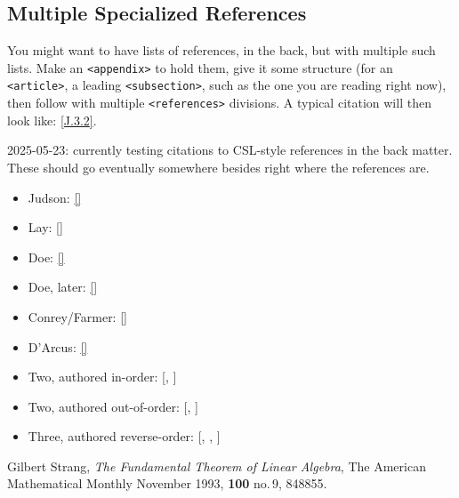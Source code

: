 \documentclass[pdflatex]{sn-jnl}
\theoremstyle{thmstyleone}%
\theoremstyle{thmstyletwo}%
\theoremstyle{thmstylethree}%
\newcommand{\xreffont}{\relax}
\newcommand{\mono}[1]{\texttt{#1}}
\numberwithin{equation}{section}
\begin{document}
\begin{appendices}
\subsection{Multiple Specialized References}\label{appendix-multiple-references-2}%
You might want to have lists of references, in the back, but with multiple such lists.  Make an \mono{<appendix>} to hold them, give it some structure (for an \mono{<article>}, a leading \mono{<subsection>}, such as the one you are reading right now), then follow with multiple \mono{<references>} divisions.  A typical citation will then look like: \hyperlink{biblio-strang-article-tres}{[{\xreffont J.3.2}]}.%
\par
2025-05-23: currently testing citations to CSL-style references in the back matter.  These should go eventually somewhere besides right where the references are.%
\begin{itemize}[label=\textbullet]
\item{}Judson: \hyperlink{biblio-judson-aata}{[{\xreffont 1}]}%
\item{}Lay: \hyperlink{biblio-lay-article}{[{\xreffont 2}]}%
\item{}Doe: \hyperlink{citeproc-py-item-3}{[{\xreffont 4}]}%
\item{}Doe, later: \hyperlink{citeproc-py-item-3-later}{[{\xreffont 3}]}%
\item{}Conrey\slash{}Farmer: \hyperlink{conrey-farmer}{[{\xreffont 5}]}%
\item{}D'Arcus: \hyperlink{citeproc-py-item-5}{[{\xreffont 6}]}%
\item{}Two, authored in-order: [\hyperlink{conrey-farmer}{{\xreffont 5}}, \hyperlink{citeproc-py-item-5}{{\xreffont 6}}]%
\item{}Two, authored out-of-order: [\hyperlink{citeproc-py-item-5}{{\xreffont 6}}, \hyperlink{conrey-farmer}{{\xreffont 5}}]%
\item{}Three, authored reverse-order: [\hyperlink{biblio-lay-article}{{\xreffont 2}}, \hyperlink{biblio-judson-aata}{{\xreffont 1}}, \hyperlink{citeproc-py-item-3}{{\xreffont 4}}]%
\end{itemize}
%
%
%
\typeout{************************************************}
\typeout{************************************************}
%

\begin{thebibliography}{99}
\hypertarget{biblio-strang-article-uno}{}Gilbert Strang, \textit{The Fundamental Theorem of Linear Algebra}, The American Mathematical Monthly November 1993, \textbf{100} no.\@\,9, 848\textendash{}855.

\end{thebibliography}
\end{appendices}
\end{document}

